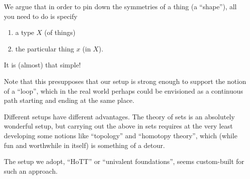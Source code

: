 We argue that in order to pin down the symmetries of a thing (a ``shape''), all you need to do is specify
\begin{enumerate}
\item a type $X$ (of things)
\item the particular thing $x$ (in $X$).
\end{enumerate}
It is (almost) that simple!

Note that this presupposes that our setup is strong enough to support the notion of a ``loop'', which in the real world perhaps could be envisioned as a continuous path starting and ending at the same place.

Different setups have different advantages.  The theory of sets is an absolutely wonderful setup, but carrying out the above in sets requires at the very least developing some notions like ``topology'' and ``homotopy theory'', which (while fun and worthwhile in itself) is something of a detour.

The setup we adopt, ``HoTT'' or ``univalent foundations'', seems custom-built for such an approach.


